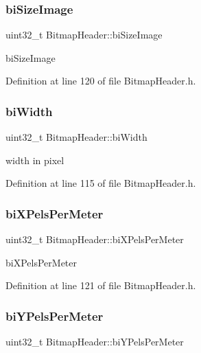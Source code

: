\subsubsection{\texorpdfstring{biSizeImage}{biSizeImage}}
{\footnotesize\ttfamily uint32\+\_\+t Bitmap\+Header\+::bi\+Size\+Image\hspace{0.3cm}{\ttfamily [private]}}

bi\+Size\+Image 

Definition at line 120 of file Bitmap\+Header.\+h.

\mbox{\label{classBitmapHeader_a6058b8b953cfe11ccb6992077e0353d0}} 
\subsubsection{\texorpdfstring{biWidth}{biWidth}}
{\footnotesize\ttfamily uint32\+\_\+t Bitmap\+Header\+::bi\+Width\hspace{0.3cm}{\ttfamily [private]}}

width in pixel 

Definition at line 115 of file Bitmap\+Header.\+h.

\mbox{\label{classBitmapHeader_a1569e156f59c8a939c9d4b668ae41bcd}} 
\subsubsection{\texorpdfstring{biXPelsPerMeter}{biXPelsPerMeter}}
{\footnotesize\ttfamily uint32\+\_\+t Bitmap\+Header\+::bi\+X\+Pels\+Per\+Meter\hspace{0.3cm}{\ttfamily [private]}}

bi\+X\+Pels\+Per\+Meter 

Definition at line 121 of file Bitmap\+Header.\+h.

\mbox{\label{classBitmapHeader_a9f029a3b36773c4da51c18e0453213c7}} 
\subsubsection{\texorpdfstring{biYPelsPerMeter}{biYPelsPerMeter}}
{\footnotesize\ttfamily uint32\+\_\+t Bitmap\+Header\+::bi\+Y\+Pels\+Per\+Meter\hspace{0.3cm}{\ttfamily [private]}}

